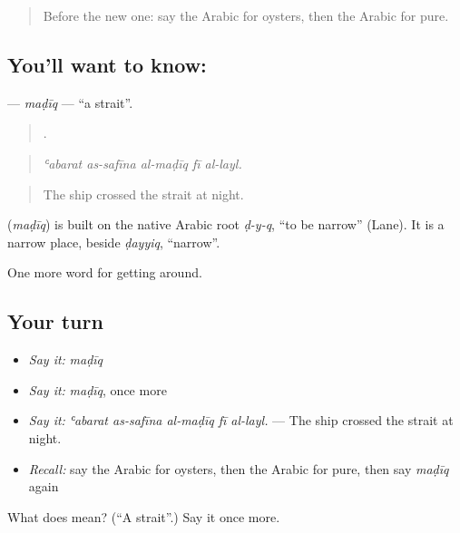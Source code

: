 \label{lesson:AR-C477-madiq}



\begin{quote}
Before the new one: say the Arabic for oysters, then the Arabic for pure.
\end{quote}

\subsection*{You'll want to know: }
\textbf{} — \emph{maḍīq} — \textquotedblleft{}a strait\textquotedblright{}.

\begin{quote}
    .
\end{quote}

\begin{quote}
\emph{ʿabarat as-safīna al-maḍīq fī al-layl.}
\end{quote}

\begin{quote}
The ship crossed the strait at night.
\end{quote}

\begin{cousinweb}
\textbf{} (\emph{maḍīq}) is built on the native Arabic root \emph{ḍ-y-q}, \textquotedblleft{}to be narrow\textquotedblright{} (Lane). It is a narrow place, beside \emph{ḍayyiq}, \textquotedblleft{}narrow\textquotedblright{}.
\end{cousinweb}

\begin{grammarlens}[title={What you've built}]
One more word for getting around.
\end{grammarlens}

\subsection*{Your turn}
\begin{itemize}
\raggedright
  \item \emph{Say it:} \emph{maḍīq}
  \item \emph{Say it:} \emph{maḍīq}, once more
  \item \emph{Say it:} \emph{ʿabarat as-safīna al-maḍīq fī al-layl.} — The ship crossed the strait at night.
  \item \emph{Recall:} say the Arabic for oysters, then the Arabic for pure, then say \emph{maḍīq} again
\end{itemize}

\begin{tcolorbox}[breakable,colback=teal!4,colframe=teal!35!black,title={Before you move on}]
What does  mean? (\textquotedblleft{}A strait\textquotedblright{}.) Say it once more.
\end{tcolorbox}
